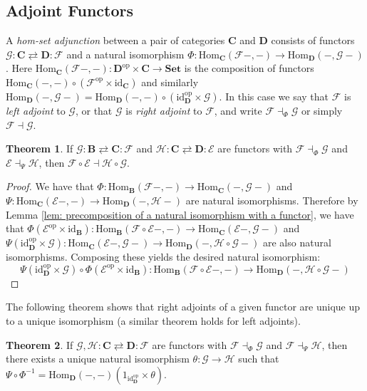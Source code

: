 \documentclass[oneside,11pt]{amsart}
\newcommand{\bB}{\ensuremath{\textbf{B}}}
\newcommand{\bC}{\ensuremath{\textbf{C}}}
\newcommand{\bD}{\ensuremath{\textbf{D}}}
\newcommand{\bSet}{\ensuremath{\textbf{Set}}}
\newcommand{\mF}{\ensuremath{\mathcal{F}}}
\newcommand{\mG}{\ensuremath{\mathcal{G}}}
\newcommand{\mE}{\ensuremath{\mathcal{E}}}
\newcommand{\mH}{\ensuremath{\mathcal{H}}}
\newcommand{\Hom}{\ensuremath{\text{Hom}}}
\newcommand{\op}{\ensuremath{\text{op}}}
\newcommand{\id}{\ensuremath{\text{id}}}
\theoremstyle{definition}
\newtheorem{proof techniques}{Proof Techniques}
\newtheorem{theorem}{Theorem}
\begin{document}
\subsection{Adjoint Functors}

A \emph{hom-set adjunction} between a pair of categories $\bC$ and $\bD$ consists of functors $\mG : \bC \rightleftarrows \bD: \mF$ and a natural isomorphism $\Phi : \Hom_\bC(\mF - , -) \to \Hom_\bD(- , \mG -)$. Here $\Hom_\bC(\mF - , -) : \bD^\op \times \bC \to \bSet$ is the composition of functors $\Hom_\bC( - , -) \circ (\mF^\op \times \id_\bC)$ and similarly $\Hom_\bD(- , \mG -) = \Hom_\bD( - , -) \circ (\id_\bD^\op \times \mG)$. In this case we say that $\mF$ is \emph{left adjoint} to $\mG$, or that $\mG$ is \emph{right adjoint} to $\mF$, and write $\mF \dashv_\Phi \mG$ or simply $\mF \dashv \mG$. 

\begin{theorem}\label{thm: composition of adjoints are adjoints}
If $\mG : \bB \rightleftarrows \bC: \mF$ and $\mH: \bC \rightleftarrows \bD : \mE$ are functors with $\mF \dashv_\Phi \mG$ and $\mE \dashv_\Psi \mH$, then $\mF \circ \mE \dashv \mH \circ \mG$. 
\end{theorem}

\begin{proof}
We have that $\Phi : \Hom_\bB( \mF - , -) \to \Hom_\bC( - , \mG -)$ and $\Psi : \Hom_\bC( \mE - , -) \to \Hom_\bD( - , \mH -)$ are natural isomorphisms. Therefore by Lemma \ref{lem: precomposition of a natural isomorphism with a functor}, we have that $\Phi (\mE^\op \times \id_\bB) : \Hom_\bB( \mF \circ \mE - , -) \to \Hom_\bC( \mE - , \mG -)$ and $\Psi (\id_\bD^\op \times \mG) : \Hom_\bC( \mE - , \mG -) \to \Hom_\bD( - , \mH\circ \mG  -)$ are also natural isomorphisms. Composing these yields the desired natural isomorphism:
\begin{equation*}
\Psi (\id_\bD^\op \times \mG) \circ \Phi (\mE^\op \times \id_\bB) : \Hom_\bB( \mF \circ \mE - , -) \to \Hom_\bD( - , \mH\circ \mG  -)
\end{equation*}
\end{proof}


The following theorem shows that right adjoints of a given functor are unique up to a unique isomorphism (a similar theorem holds for left adjoints). 

\begin{theorem}\label{thm: adjoints are unique}
If $\mG, \mH : \bC \rightleftarrows \bD : \mF$ are functors with $\mF \dashv_\Phi \mG$ and $\mF \dashv_\Psi \mH$, then there exists a unique natural isomorphism $\theta : \mG \to \mH$ such that $\Psi \circ \Phi^{-1} = \Hom_\bD ( -  , - ) (1_{\id_\bD^\op} \times \theta)$.  
\end{theorem}
\end{document}
